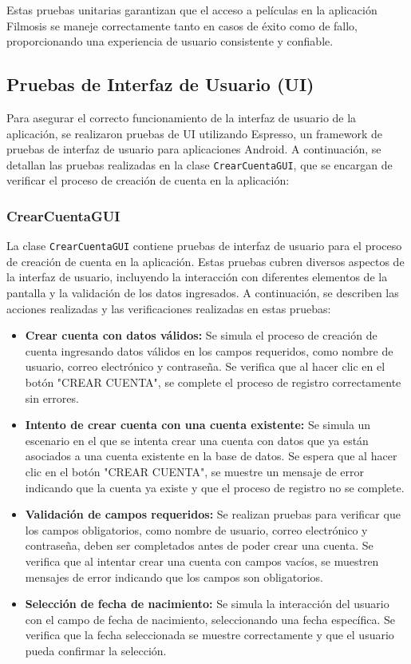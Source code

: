\documentclass{article}
\begin{document}
Estas pruebas unitarias garantizan que el acceso a películas en la aplicación Filmosis se maneje correctamente tanto en casos de éxito como de fallo, proporcionando una experiencia de usuario consistente y confiable.


\subsection{Pruebas de Interfaz de Usuario (UI)}

Para asegurar el correcto funcionamiento de la interfaz de usuario de la aplicación, se realizaron pruebas de UI utilizando Espresso, un framework de pruebas de interfaz de usuario para aplicaciones Android. A continuación, se detallan las pruebas realizadas en la clase \texttt{CrearCuentaGUI}, que se encargan de verificar el proceso de creación de cuenta en la aplicación:


\subsubsection{CrearCuentaGUI}

La clase \texttt{CrearCuentaGUI} contiene pruebas de interfaz de usuario para el proceso de creación de cuenta en la aplicación. Estas pruebas cubren diversos aspectos de la interfaz de usuario, incluyendo la interacción con diferentes elementos de la pantalla y la validación de los datos ingresados. A continuación, se describen las acciones realizadas y las verificaciones realizadas en estas pruebas:

\begin{itemize}
    \item \textbf{Crear cuenta con datos válidos:} Se simula el proceso de creación de cuenta ingresando datos válidos en los campos requeridos, como nombre de usuario, correo electrónico y contraseña. Se verifica que al hacer clic en el botón "CREAR CUENTA", se complete el proceso de registro correctamente sin errores.
    
    \item \textbf{Intento de crear cuenta con una cuenta existente:} Se simula un escenario en el que se intenta crear una cuenta con datos que ya están asociados a una cuenta existente en la base de datos. Se espera que al hacer clic en el botón "CREAR CUENTA", se muestre un mensaje de error indicando que la cuenta ya existe y que el proceso de registro no se complete.
    
    \item \textbf{Validación de campos requeridos:} Se realizan pruebas para verificar que los campos obligatorios, como nombre de usuario, correo electrónico y contraseña, deben ser completados antes de poder crear una cuenta. Se verifica que al intentar crear una cuenta con campos vacíos, se muestren mensajes de error indicando que los campos son obligatorios.
    
    \item \textbf{Selección de fecha de nacimiento:} Se simula la interacción del usuario con el campo de fecha de nacimiento, seleccionando una fecha específica. Se verifica que la fecha seleccionada se muestre correctamente y que el usuario pueda confirmar la selección.
\end{itemize}
\end{document}
